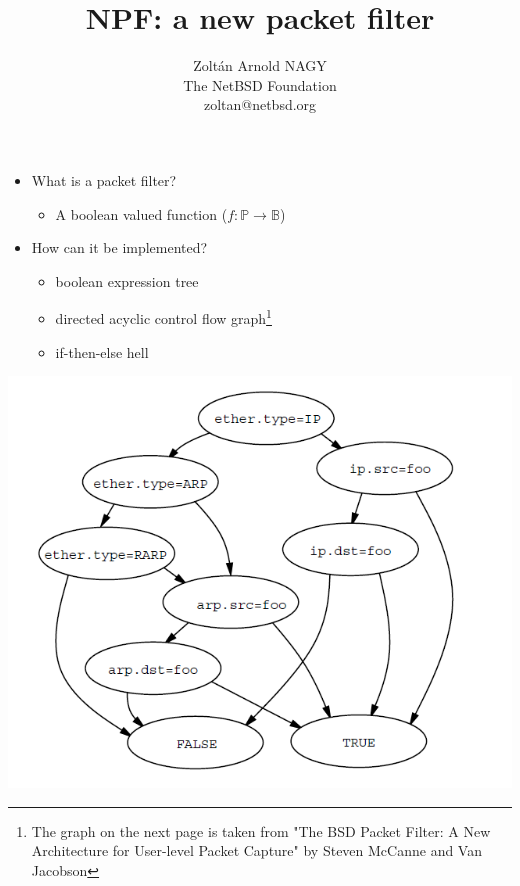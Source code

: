 \documentclass[magyar]{beamer}
\date{}
\begin{document}
\title{NPF: a new packet filter}
\author{Zoltán Arnold NAGY \\ The NetBSD Foundation \\ zoltan@netbsd.org}
\maketitle

\begin{frame}
\begin{itemize}
	\item What is a packet filter?
\pause
	\begin{itemize}
		\item A boolean valued function ($f:\mathbb{P} \rightarrow \mathbb{B}$)
	\end{itemize}
\pause
	\item How can it be implemented?
\pause
	\begin{itemize}
		\item boolean expression tree
		\item directed acyclic control flow graph\footnote{The graph on the next page is taken from "The BSD Packet Filter: A New
Architecture for User-level Packet Capture" by Steven McCanne and Van Jacobson}
		\item if-then-else hell
	\end{itemize}
\end{itemize}
\end{frame}

\begin{frame}
\begin{center}
	\includegraphics[scale=.5]{cfg}
\end{center}
\end{frame}
\end{document}
